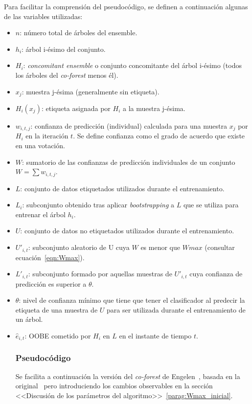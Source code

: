 Para facilitar la comprensión del pseudocódigo, se definen a continuación algunas de las variables utilizadas:
\begin{itemize}
	\item $n$: número total de árboles del ensemble.
	\item $h_{i}$: árbol i-ésimo del conjunto.
	\item $H_{i}$: \textit{concomitant ensemble} o conjunto concomitante del árbol i-ésimo (todos los árboles del \textit{co-forest} menos él).
	\item $x_j$: muestra j-ésima (generalmente sin etiqueta).
	\item $H_i(x_j)$: etiqueta asignada por $H_i$ a la muestra j-ésima.
	\item $w_{i,t,j}$: confianza de predicción (individual) calculada para una muestra $x_j$ por $H_{i}$ en la iteración $t$. Se define confianza como el grado de acuerdo que existe en una votación. 
	\item $W$: sumatorio de las confianzas de predicción individuales de un conjunto $W = \sum w_{i,t,j}$.
	\item $L$: conjunto de datos etiquetados utilizados durante el entrenamiento.
	\item $L_{i}$: subconjunto obtenido tras aplicar \textit{bootstrapping} a $L$ que se utiliza para entrenar el árbol $h_{i}$.
	\item $U$: conjunto de datos no etiquetados utilizados durante el entrenamiento.
	\item $U'_{i,t}$: subconjunto aleatorio de U cuya $W$ es menor que $Wmax$ (consultar ecuación~\ref{eqn:Wmax}).
	\item $L'_{i,t}$: subconjunto formado por aquellas muestras de $U'_{i,t}$ cuya confianza de predicción es superior a $\theta$.
	\item $\theta$: nivel de confianza mínimo que tiene que tener el clasificador al predecir la etiqueta de una muestra de $U$ para ser utilizada durante el entrenamiento de un árbol.
	\item $\hat{e}_{i,t}$: OOBE cometido por $H_{i}$ en $L$ en el instante de tiempo $t$.

\subsubsection{Pseudocódigo}

Se facilita a continuación la versión del \textit{co-forest} de Engelen~\cite{engelen2018thesis}, basada en la original~\cite{originalCoForest2007} pero introduciendo los cambios observables en la sección <<Discusión de los parámetros del algoritmo>>~\ref{parag:Wmax_inicial}.


\end{itemize}
